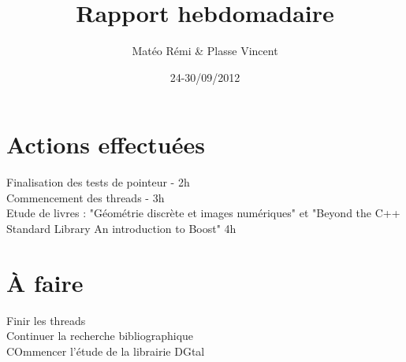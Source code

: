 \documentclass{article}
\title{Rapport hebdomadaire}
\author{Matéo Rémi \& Plasse Vincent}
\date{24-30/09/2012}
\begin{document}
\maketitle

\section{Actions effectuées}
Finalisation des tests de pointeur - 2h \\
Commencement des threads - 3h \\
Etude de livres : "Géométrie discrète et images numériques" et "Beyond the C++ Standard Library An introduction to Boost" 4h \\

\section{À faire}
Finir les threads \\
Continuer la recherche bibliographique \\
COmmencer l'étude de la librairie DGtal \\
\end{document}
